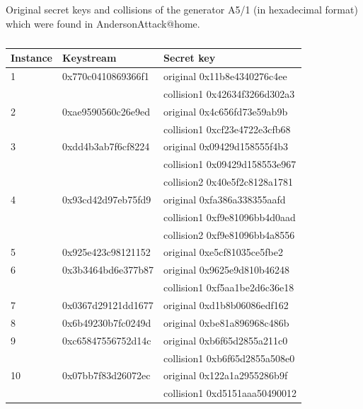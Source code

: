 \documentclass[runningheads,a4paper]{llncs}[2015/06/24]
\begin{document}
\begin{table} \caption{} \label{tab:keys} Original secret keys and collisions of the
	generator A5/1 (in hexadecimal format) which were found in
	AndersonAttack@home.
	\begin {center} 
		\begin{tabular}
			{| l | l | l |}
			\hline
			Instance & Keystream & Secret key \\ \hline
			1 & 0x770c0410869366f1 & original 0x11b8e4340276c4ee \\
			  &                    & collision1 0x42634f3266d302a3 \\ \hline
			2 & 0xae9590560c26e9ed & original 0x4c656fd73e59ab9b \\
			  &                    & collision1 0xcf23e4722e3cfb68 \\ \hline
			3 & 0xdd4b3ab7f6cf8224 & original 0x09429d158555f4b3 \\
			  &                    & collision1 0x09429d158553e967 \\
			  &                    & collision2 0x40e5f2c8128a1781 \\ \hline
			4 & 0x93cd42d97eb75fd9 & original 0xfa386a338355aafd \\
			  &                    & collision1 0xf9e81096bb4d0aad \\ 
			  &                    & collision2 0xf9e81096bb4a8556 \\ \hline
			5 & 0x925e423c98121152 & original 0xe5cf81035ce5fbe2 \\ \hline
			6 & 0x3b3464bd6e377b87 & original 0x9625e9d810b46248 \\
			  &                    & collision1 0xf5aa1be2d6c36e18 \\ \hline
			7 & 0x0367d29121dd1677 & original 0xd1b8b06086edf162 \\ \hline
			8 & 0x6b49230b7fc0249d & original 0xbe81a896968c486b \\ \hline
			9 & 0xc65847556752d14c & original 0xb6f65d2855a211c0 \\ 
			  &                    & collision1 0xb6f65d2855a508e0 \\ \hline
			10& 0x07bb7f83d26072ec & original 0x122a1a2955286b9f \\ 
			  &                    & collision1 0xd5151aaa50490012 \\ \hline
		\end{tabular}
	\end {center}
\end{table}
\end{document}
